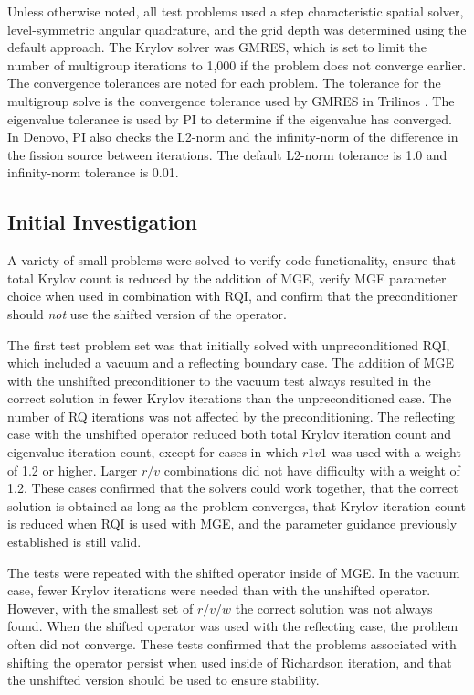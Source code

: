 \documentclass[preprint,12pt]{elsarticle}
\begin{document}
Unless otherwise noted, all test problems used a step characteristic spatial solver, level-symmetric angular quadrature, and the grid depth was determined using the default approach.%
The Krylov solver was GMRES, which is set to limit the number of multigroup iterations to 1,000 if the problem does not converge earlier. The convergence tolerances are noted for each problem. The tolerance for the multigroup solve is the convergence tolerance used by GMRES in Trilinos \cite{1089021}. The eigenvalue tolerance is used by PI to determine if the eigenvalue has converged. In Denovo, PI also checks the L2-norm and the infinity-norm of the difference in the fission source between iterations. The default L2-norm tolerance is 1.0 and infinity-norm tolerance is 0.01.

\subsection{Initial Investigation}
A variety of small problems were solved to verify code functionality, ensure that total Krylov count is reduced by the addition of MGE, verify MGE parameter choice when used in combination with RQI, and confirm that the preconditioner should \emph{not} use the shifted version of the operator.

The first test problem set was that initially solved with unpreconditioned RQI, which included a vacuum and a reflecting boundary case. The addition of MGE with the unshifted preconditioner to the vacuum test always resulted in the correct solution in fewer Krylov iterations than the unpreconditioned case. The number of RQ iterations was not affected by the preconditioning. The reflecting case with the unshifted operator reduced both total Krylov iteration count and eigenvalue iteration count, except for cases in which $r1v1$ was used with a weight of 1.2 or higher. Larger $r/v$ combinations did not have difficulty with a weight of 1.2. These cases confirmed that the solvers could work together, that the correct solution is obtained as long as the problem converges, that Krylov iteration count is reduced when RQI is used with MGE, and the parameter guidance previously established is still valid. 

The tests were repeated with the shifted operator inside of MGE. In the vacuum case, fewer Krylov iterations were needed than with the unshifted operator. However, with the smallest set of $r/v/w$ the correct solution was not always found. When the shifted operator was used with the reflecting case, the problem often did not converge. These tests confirmed that the problems associated with shifting the operator persist when used inside of Richardson iteration, and that the unshifted version should be used to ensure stability. 
\end{document}
